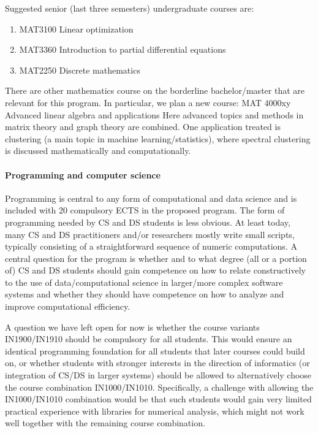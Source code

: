 \documentclass[oneside,final,10pt]{article}
\begin{document}
Suggested senior (last three semesters) undergraduate courses are:
\begin{enumerate}
    \item MAT3100 Linear optimization
    \item MAT3360 Introduction to partial differential equations
    \item MAT2250 Discrete mathematics
\end{enumerate}

There are other mathematics course on the borderline bachelor/master that are relevant for this program. In particular, we plan a new course:
\vskip2mm
MAT 4000xy Advanced linear algebra and applications
\vskip2mm
Here advanced topics and methods in matrix theory and graph theory are combined. One application treated is clustering (a main topic in machine learning/statistics), where spectral clustering is discussed mathematically and computationally. 


\paragraph{Programming and computer science}
Programming is central to any form of computational and data science and is included with 20 compulsory ECTS in the proposed program. The form of programming needed by CS and DS students is less obvious. At least today, many CS and DS practitioners and/or researchers mostly write small scripts, typically consisting of a straightforward sequence of numeric computations. A central question for the program is whether and to what degree (all or a portion of) CS and DS students should gain competence on how to relate constructively to the use of data/computational science in larger/more complex software systems and whether they should have competence on how to analyze and improve computational efficiency. 

A question we have left open for now is whether the course variants IN1900/IN1910 should be compulsory for all students. This would ensure an identical programming foundation for all students that later courses could build on, or whether students with stronger interests in the direction of informatics (or integration of CS/DS in larger systems) should be allowed to alternatively choose the course combination IN1000/IN1010. Specifically, a challenge with allowing the IN1000/IN1010 combination would be that such students would gain very limited practical experience with libraries for numerical analysis, which might not work well together with the remaining course combination.
\end{document}
